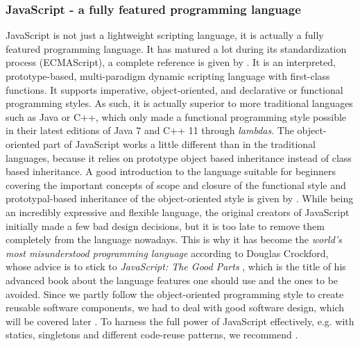 \subsubsection{JavaScript - a fully featured programming language}
JavaScript is not just a lightweight scripting language, it is actually a fully featured programming language. It has matured a lot during its standardization process (ECMAScript), a complete reference is given by \cite{flanagan2011javascript}. It is an interpreted, prototype-based, multi-paradigm dynamic scripting language with first-class functions. It supports imperative, object-oriented, and declarative or functional programming styles. As such, it is actually superior to more traditional languages such as Java or C++, which only made a functional programming style possible in their latest editions of Java 7 and C++ 11 through \textit{lambdas}. The object-oriented part of JavaScript works a little different than in the traditional languages, because it relies on prototype object based inheritance instead of class based inheritance. A good introduction to the language suitable for beginners covering the important concepts of scope and closure of the functional style and prototypal-based inheritance of the object-oriented style is given by \cite{haverbeke2015eloquent,resig2013secrets}.
While being an incredibly expressive and flexible language, the original creators of JavaScript initially made a few bad design decisions, but it is too late to remove them completely from the language nowadays. This is why it has become the \textit{world's most misunderstood programming language} according to Douglas Crockford, whose advice is to stick to \textit{JavaScript: The Good Parts} \cite{crockford2008javascript}, which is the title of his advanced book about the language features one should use and the ones to be avoided.
Since we partly follow the object-oriented programming style to create reusable software components, we had to deal with good software design, which will be covered later . To harness the full power of JavaScript effectively, e.g. with statics, singletons and different code-reuse patterns, we recommend \cite{herman2012effective}.

